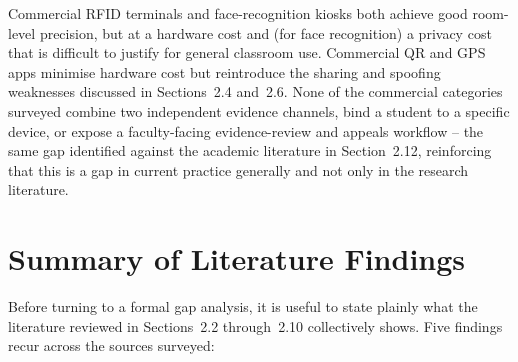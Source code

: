 \documentclass[12pt, a4paper, oneside]{report}
\begin{document}
\begin{table}[p]
\centering
\caption{Comparison with Commercial Attendance Systems}
\label{tab:commercial-comparison}
\scriptsize
\setlength{\tabcolsep}{2.5pt}
\renewcommand{\arraystretch}{1.1}
\end{table}

Commercial RFID terminals and face-recognition kiosks both achieve good room-level precision, but at a hardware cost and (for face recognition) a privacy cost that is difficult to justify for general classroom use. Commercial QR and GPS apps minimise hardware cost but reintroduce the sharing and spoofing weaknesses discussed in Sections~2.4 and~2.6. None of the commercial categories surveyed combine two independent evidence channels, bind a student to a specific device, or expose a faculty-facing evidence-review and appeals workflow -- the same gap identified against the academic literature in Section~2.12, reinforcing that this is a gap in current practice generally and not only in the research literature.

\section{Summary of Literature Findings}

Before turning to a formal gap analysis, it is useful to state plainly what the literature reviewed in Sections~2.2 through~2.10 collectively shows. Five findings recur across the sources surveyed:
\end{document}
